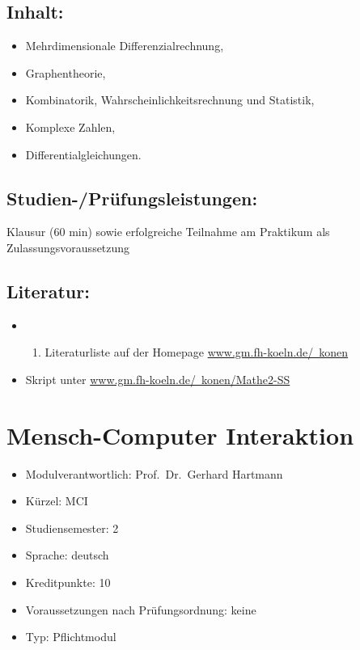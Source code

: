 \section*{Inhalt:}\label{inhalt-14}

\begin{itemize}
\tightlist
\item
  Mehrdimensionale Differenzialrechnung,
\item
  Graphentheorie,
\item
  Kombinatorik, Wahrscheinlichkeitsrechnung und Statistik,
\item
  Komplexe Zahlen,
\item
  Differentialgleichungen.
\end{itemize}

\section*{Studien-/Prüfungsleistungen:}\label{studien-pruxfcfungsleistungen-12}

Klausur (60 min) sowie erfolgreiche Teilnahme am Praktikum als
Zulassungsvoraussetzung

\section*{Literatur:}\label{literatur-11}

\begin{itemize}
\tightlist
\item
  \begin{enumerate}
  \def\labelenumi{\alph{enumi}.}
  \setcounter{enumi}{18}
  \tightlist
  \item
    Literaturliste auf der Homepage \href{www.gm.fh-koeln.de/~konen}{www.gm.fh-koeln.de/~konen}
  \end{enumerate}
\item
  Skript unter \href{www.gm.fh-koeln.de/~konen/Mathe2-SS}{www.gm.fh-koeln.de/~konen/Mathe2-SS}
\end{itemize}

\chapter{Mensch-Computer Interaktion}\label{mensch-computer-interaktion}

\begin{itemize}
\tightlist
\item
  Modulverantwortlich: Prof.~Dr.~Gerhard Hartmann
\item
  Kürzel: MCI
\item
  Studiensemester: 2
\item
  Sprache: deutsch
\item
  Kreditpunkte: 10
\item
  Voraussetzungen nach Prüfungsordnung: keine
\item
  Typ: Pflichtmodul
\end{itemize}

